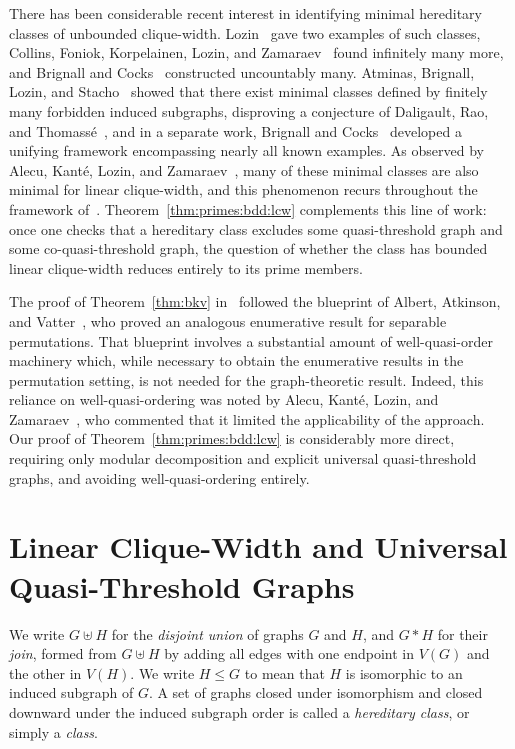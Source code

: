 \documentclass[10pt]{article}
\theoremstyle{plain}
\begin{document}
There has been considerable recent interest in identifying minimal hereditary classes of unbounded clique-width. Lozin~\cite{lozin:minimal-classes:} gave two examples of such classes, Collins, Foniok, Korpelainen, Lozin, and Zamaraev~\cite{collins:infinitely-many:} found infinitely many more, and Brignall and Cocks~\cite{brignall:uncountably-man:cw} constructed uncountably many. Atminas, Brignall, Lozin, and Stacho~\cite{atminas:minimal-classes:} showed that there exist minimal classes defined by finitely many forbidden induced subgraphs, disproving a conjecture of Daligault, Rao, and Thomass\'e~\cite{daligault:well-quasi-orde:}, and in a separate work, Brignall and Cocks~\cite{brignall:a-framework-for:} developed a unifying framework encompassing nearly all known examples. As observed by Alecu, Kant\'e, Lozin, and Zamaraev~\cite{alecu:between-clique-:}, many of these minimal classes are also minimal for linear clique-width, and this phenomenon recurs throughout the framework of~\cite{brignall:a-framework-for:}. Theorem~\ref{thm:primes:bdd:lcw} complements this line of work: once one checks that a hereditary class excludes some quasi-threshold graph and some co-quasi-threshold graph, the question of whether the class has bounded linear clique-width reduces entirely to its prime members.

The proof of Theorem~\ref{thm:bkv} in~\cite{brignall:linear-clique-w:} followed the blueprint of Albert, Atkinson, and Vatter~\cite{albert:subclasses-of-t:}, who proved an analogous enumerative result for separable permutations. That blueprint involves a substantial amount of well-quasi-order machinery which, while necessary to obtain the enumerative results in the permutation setting, is not needed for the graph-theoretic result. Indeed, this reliance on well-quasi-ordering was noted by Alecu, Kant\'e, Lozin, and Zamaraev~\cite{alecu:between-clique-:}, who commented that it limited the applicability of the approach. Our proof of Theorem~\ref{thm:primes:bdd:lcw} is considerably more direct, requiring only modular decomposition and explicit universal quasi-threshold graphs, and avoiding well-quasi-ordering entirely.

%
%
%
%
%

\section{Linear Clique-Width and Universal Quasi-Threshold Graphs}
\label{sec:Qt}

We write $G\uplus H$ for the \emph{disjoint union} of graphs $G$ and $H$, and $G\ast H$ for their \emph{join}, formed from $G\uplus H$ by adding all edges with one endpoint in $V(G)$ and the other in $V(H)$. We write $H\le G$ to mean that $H$ is isomorphic to an induced subgraph of $G$. A set of graphs closed under isomorphism and closed downward under the induced subgraph order is called a \emph{hereditary class}, or simply a \emph{class}.
\end{document}
